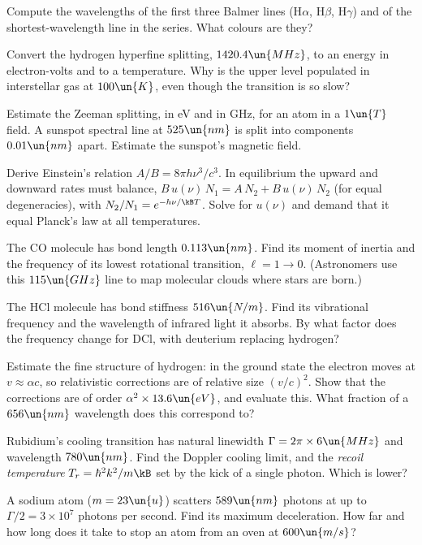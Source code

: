 \begin{problems}
\core Compute the wavelengths of the first three Balmer lines (H$\alpha$, H$\beta$, H$\gamma$) and of the shortest-wavelength line in the series. What colours are they?

 Convert the hydrogen hyperfine splitting, $1420.4\un{MHz}$, to an energy in electron-volts and to a temperature. Why is the upper level populated in interstellar gas at $100\un{K}$, even though the transition is so slow?

 Estimate the Zeeman splitting, in eV and in GHz, for an atom in a $1\un{T}$ field. A sunspot spectral line at $525\un{nm}$ is split into components $0.01\un{nm}$ apart. Estimate the sunspot's magnetic field.

\core Derive Einstein's relation $A/B = 8\pi h\nu^3/c^3$. In equilibrium the upward and downward rates must balance, $B\,u(\nu)\,N_1 = A\,N_2 + B\,u(\nu)\,N_2$ (for equal degeneracies), with $N_2/N_1 = e^{-h\nu/\kB T}$. Solve for $u(\nu)$ and demand that it equal Planck's law at all temperatures.

 The CO molecule has bond length $0.113\un{nm}$. Find its moment of inertia and the frequency of its lowest rotational transition, $\ell = 1\to0$. (Astronomers use this $115\un{GHz}$ line to map molecular clouds where stars are born.)

 The HCl molecule has bond stiffness $516\un{N/m}$. Find its vibrational frequency and the wavelength of infrared light it absorbs. By what factor does the frequency change for DCl, with deuterium replacing hydrogen?

\core Estimate the fine structure of hydrogen: in the ground state the electron moves at $v\approx\alpha c$, so relativistic corrections are of relative size $(v/c)^2$. Show that the corrections are of order $\alpha^2\times13.6\un{eV}$, and evaluate this. What fraction of a $656\un{nm}$ wavelength does this correspond to?

 Rubidium's cooling transition has natural linewidth $\Gamma = 2\pi\times6\un{MHz}$ and wavelength $780\un{nm}$. Find the Doppler cooling limit, and the \emph{recoil temperature} $T_r = \hbar^2k^2/m\kB$ set by the kick of a single photon. Which is lower?

 A sodium atom ($m = 23\un{u}$) scatters $589\un{nm}$ photons at up to $\Gamma/2 = 3\times10^7$ photons per second. Find its maximum deceleration. How far and how long does it take to stop an atom from an oven at $600\un{m/s}$?


\end{problems}
